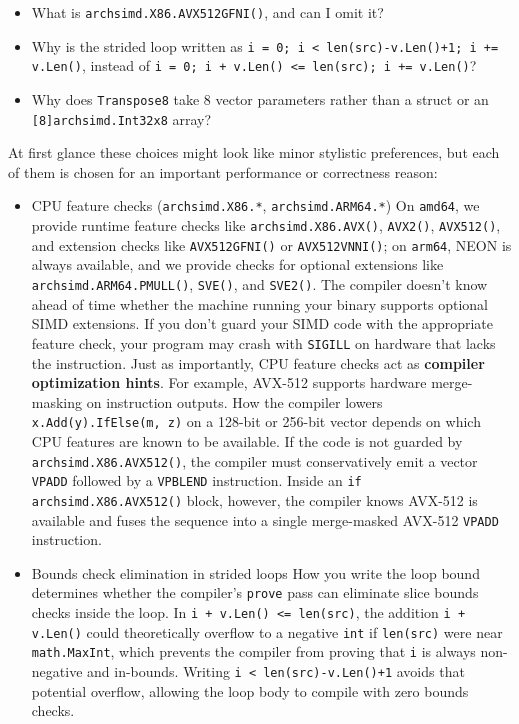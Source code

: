 \documentclass[11pt,a4paper]{article}
\begin{document}
\begin{itemize}
\item What is \texttt{archsimd.X86.AVX512GFNI()}, and can I omit it?
\item Why is the strided loop written as \texttt{i = 0; i < len(src)-v.Len()+1; i += v.Len()}, instead of \texttt{i = 0; i + v.Len() <= len(src); i += v.Len()}?
\item Why does \texttt{Transpose8} take 8 vector parameters rather than a struct or an \texttt{[8]archsimd.Int32x8} array?
\end{itemize}

At first glance these choices might look like minor stylistic preferences, but each of them is chosen for an important performance or correctness reason:

\begin{itemize}
\item CPU feature checks (\texttt{archsimd.X86.*}, \texttt{archsimd.ARM64.*}) On \texttt{amd64}, we provide runtime feature checks like \texttt{archsimd.X86.AVX()}, \texttt{AVX2()}, \texttt{AVX512()}, and extension checks like \texttt{AVX512GFNI()} or \texttt{AVX512VNNI()}; on \texttt{arm64}, NEON is always available, and we provide checks for optional extensions like \texttt{archsimd.ARM64.PMULL()}, \texttt{SVE()}, and \texttt{SVE2()}. The compiler doesn't know ahead of time whether the machine running your binary supports optional SIMD extensions. If you don't guard your SIMD code with the appropriate feature check, your program may crash with \texttt{SIGILL} on hardware that lacks the instruction. Just as importantly, CPU feature checks act as \textbf{compiler optimization hints}. For example, AVX-512 supports hardware merge-masking on instruction outputs. How the compiler lowers \texttt{x.Add(y).IfElse(m, z)} on a 128-bit or 256-bit vector depends on which CPU features are known to be available. If the code is not guarded by \texttt{archsimd.X86.AVX512()}, the compiler must conservatively emit a vector \texttt{VPADD} followed by a \texttt{VPBLEND} instruction. Inside an \texttt{if archsimd.X86.AVX512()} block, however, the compiler knows AVX-512 is available and fuses the sequence into a single merge-masked AVX-512 \texttt{VPADD} instruction.
\item Bounds check elimination in strided loops How you write the loop bound determines whether the compiler's \texttt{prove} pass can eliminate slice bounds checks inside the loop. In \texttt{i + v.Len() <= len(src)}, the addition \texttt{i + v.Len()} could theoretically overflow to a negative \texttt{int} if \texttt{len(src)} were near \texttt{math.MaxInt}, which prevents the compiler from proving that \texttt{i} is always non-negative and in-bounds. Writing \texttt{i < len(src)-v.Len()+1} avoids that potential overflow, allowing the loop body to compile with zero bounds checks.

\end{itemize}
\end{document}
